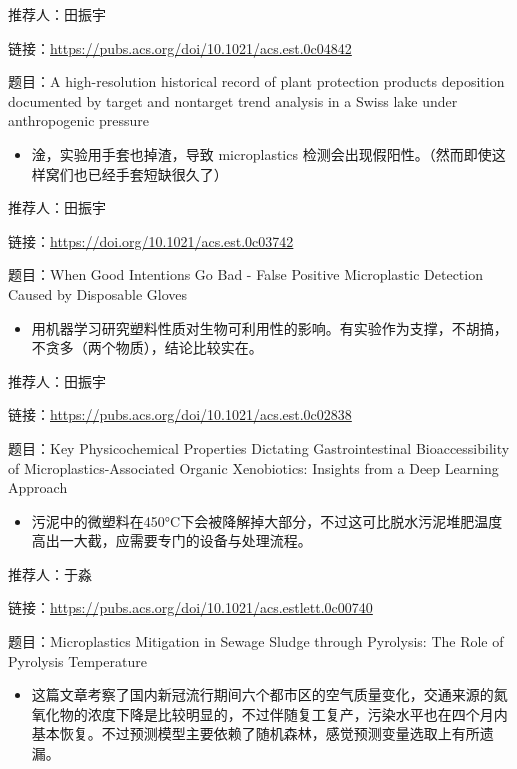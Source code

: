 \documentclass[
]{book}
\providecommand{\tightlist}{%
  \setlength{\itemsep}{0pt}\setlength{\parskip}{0pt}}
\begin{document}
推荐人：田振宇

链接：\url{https://pubs.acs.org/doi/10.1021/acs.est.0c04842}

题目：A high-resolution historical record of plant protection products deposition documented by target and nontarget trend analysis in a Swiss lake under anthropogenic pressure

\begin{itemize}
\tightlist
\item
  淦，实验用手套也掉渣，导致 microplastics 检测会出现假阳性。（然而即使这样窝们也已经手套短缺很久了）
\end{itemize}

推荐人：田振宇

链接：\url{https://doi.org/10.1021/acs.est.0c03742}

题目：When Good Intentions Go Bad - False Positive Microplastic Detection Caused by Disposable Gloves

\begin{itemize}
\tightlist
\item
  用机器学习研究塑料性质对生物可利用性的影响。有实验作为支撑，不胡搞，不贪多（两个物质），结论比较实在。
\end{itemize}

推荐人：田振宇

链接：\url{https://pubs.acs.org/doi/10.1021/acs.est.0c02838}

题目：Key Physicochemical Properties Dictating Gastrointestinal Bioaccessibility of Microplastics-Associated Organic Xenobiotics: Insights from a Deep Learning Approach

\begin{itemize}
\tightlist
\item
  污泥中的微塑料在450°C下会被降解掉大部分，不过这可比脱水污泥堆肥温度高出一大截，应需要专门的设备与处理流程。
\end{itemize}

推荐人：于淼

链接：\url{https://pubs.acs.org/doi/10.1021/acs.estlett.0c00740}

题目：Microplastics Mitigation in Sewage Sludge through Pyrolysis: The Role of Pyrolysis Temperature

\begin{itemize}
\tightlist
\item
  这篇文章考察了国内新冠流行期间六个都市区的空气质量变化，交通来源的氮氧化物的浓度下降是比较明显的，不过伴随复工复产，污染水平也在四个月内基本恢复。不过预测模型主要依赖了随机森林，感觉预测变量选取上有所遗漏。
\end{itemize}
\end{document}
